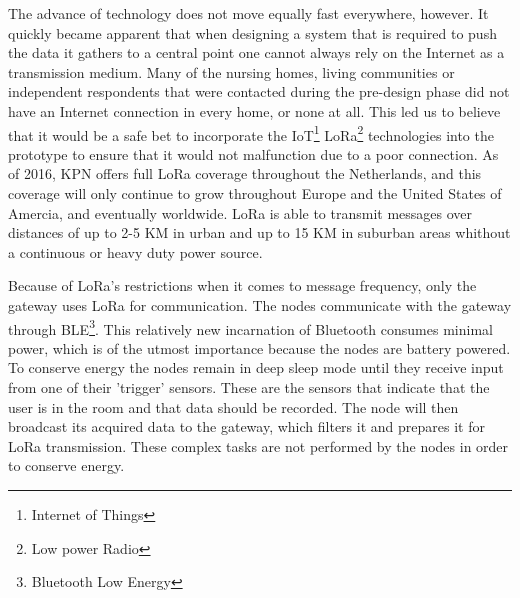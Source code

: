 \documentclass{below-ext}
\begin{document}
The advance of technology does not move equally fast everywhere, however. It quickly became apparent that when designing a system that is required to push the data it gathers to a central point one cannot always rely on the Internet as a transmission medium. Many of the nursing homes, living communities or independent respondents that were contacted during the pre-design phase did not have an Internet connection in every home, or none at all. This led us to believe that it would be a safe bet to incorporate the IoT\footnote{Internet of Things} LoRa\footnote{Low power Radio} technologies into the prototype to ensure that it would not malfunction due to a poor connection. As of 2016, KPN offers full LoRa coverage throughout the Netherlands, and this coverage will only continue to grow throughout Europe and the United States of Amercia, and eventually worldwide. LoRa is able to transmit messages over distances of up to 2-5 KM in urban and up to 15 KM in suburban areas whithout a continuous or heavy duty power source\cite{Adelantado:2016aa}.


Because of LoRa's restrictions when it comes to message frequency, only the gateway uses LoRa for communication. The nodes communicate with the gateway through BLE\footnote{Bluetooth Low Energy}. This relatively new incarnation of Bluetooth consumes minimal power, which is of the utmost importance because the nodes are battery powered.\cite{s120911734} To conserve energy the nodes remain in deep sleep mode until they receive input from one of their  'trigger' sensors. These are the sensors that indicate that the user is in the room and that data should be recorded. The node will then broadcast its acquired data to the gateway, which filters it and prepares it for LoRa transmission. These complex tasks are not performed by the nodes in order to conserve energy.  
\end{document}
